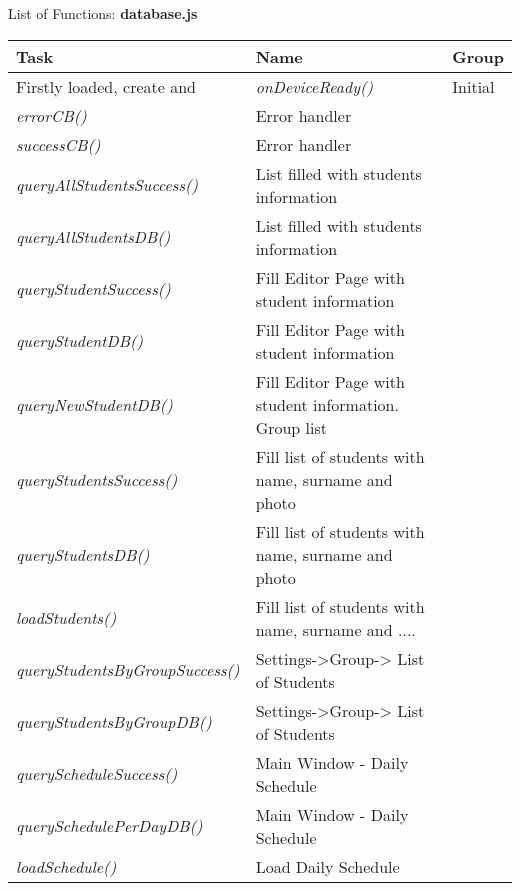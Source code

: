 \begin{bclogo}[couleur=blue!30,arrondi=0.1, logo=\bcpanchant, barre=zigzag,  ombre=true ] 
{List of Functions: {\bf database.js}}	
\begin{tabular}{lll}
Task                    & Name            & Group \\
\hline
Firstly loaded, create and    & \emph{ onDeviceReady()  }& Initial\\
\emph{ errorCB() }                         & Error handler \\
\emph{  successCB()            }           &  Error handler \\
\emph { queryAllStudentsSuccess()}         & List filled with students information \\
\emph { queryAllStudentsDB() }             & List filled with students information \\
\emph { queryStudentSuccess() }            & Fill Editor Page with student information \\
\emph { queryStudentDB() }                 & Fill Editor Page with student information \\
\emph { queryNewStudentDB() }              & Fill Editor Page with student information. Group list \\
\emph { queryStudentsSuccess() }           & Fill list of students with name, surname and photo  \\
\emph { queryStudentsDB() }                & Fill list of students with name, surname and photo  \\
\emph { loadStudents()  }                  & Fill list of students with name, surname and  .... \\
\emph { queryStudentsByGroupSuccess() }     & Settings->Group-> List of Students \\
\emph { queryStudentsByGroupDB() }          & Settings->Group-> List of Students \\
\emph { queryScheduleSuccess() }          & Main Window - Daily Schedule \\
\emph { querySchedulePerDayDB() }         & Main Window - Daily Schedule \\
\emph { loadSchedule() }       & { Load Daily Schedule } \\


\end{tabular}
\end{bclogo}
